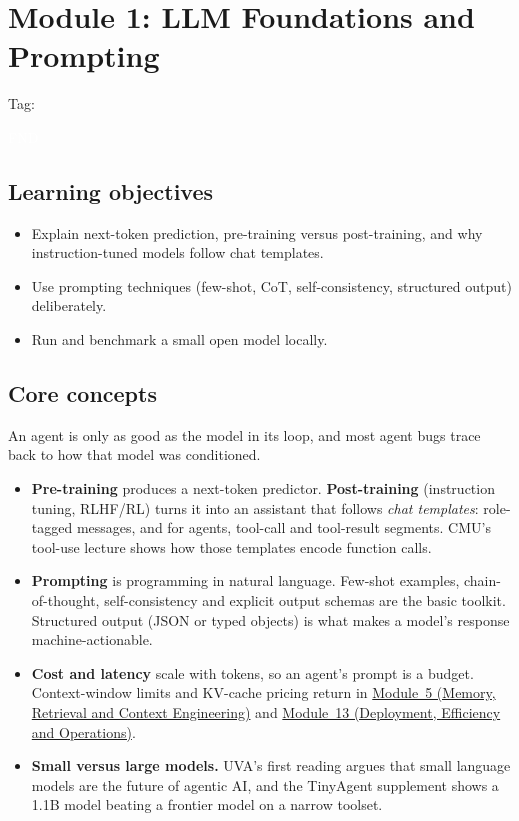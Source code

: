 \documentclass[10pt,oneside]{report}
\newcommand{\tg}[1]{{\setlength{\fboxsep}{1.2pt}\colorbox{tag#1}{\kern1pt\textcolor{white}{\sffamily\bfseries\fontsize{5.5}{6}\selectfont\strut #1}\kern1.5pt}}}
\begin{document}
\chapter{Module 1: LLM Foundations and Prompting}\hypertarget{mod-FND}{}
{\small Tag: \tg{FND}}
\section{Learning objectives}
\begin{itemize}
\item Explain next-token prediction, pre-training versus post-training, and why instruction-tuned models follow chat templates.
\item Use prompting techniques (few-shot, CoT, self-consistency, structured output) deliberately.
\item Run and benchmark a small open model locally.
\end{itemize}
\section{Core concepts}
An agent is only as good as the model in its loop, and most agent bugs trace back to how that model was conditioned.
\begin{itemize}
\item \textbf{Pre-training} produces a next-token predictor. \textbf{Post-training} (instruction tuning, RLHF/RL) turns it into an assistant that follows \emph{chat templates}: role-tagged messages, and for agents, tool-call and tool-result segments. CMU's tool-use lecture shows how those templates encode function calls.
\item \textbf{Prompting} is programming in natural language. Few-shot examples, chain-of-thought, self-consistency and explicit output schemas are the basic toolkit. Structured output (JSON or typed objects) is what makes a model's response machine-actionable.
\item \textbf{Cost and latency} scale with tokens, so an agent's prompt is a budget. Context-window limits and KV-cache pricing return in \hyperlink{mod-MEM}{Module~5 (Memory, Retrieval and Context Engineering)} and \hyperlink{mod-DEPLOY}{Module~13 (Deployment, Efficiency and Operations)}.
\item \textbf{Small versus large models.} UVA's first reading argues that small language models are the future of agentic AI, and the TinyAgent supplement shows a 1.1B model beating a frontier model on a narrow toolset.
\end{itemize}
\end{document}
